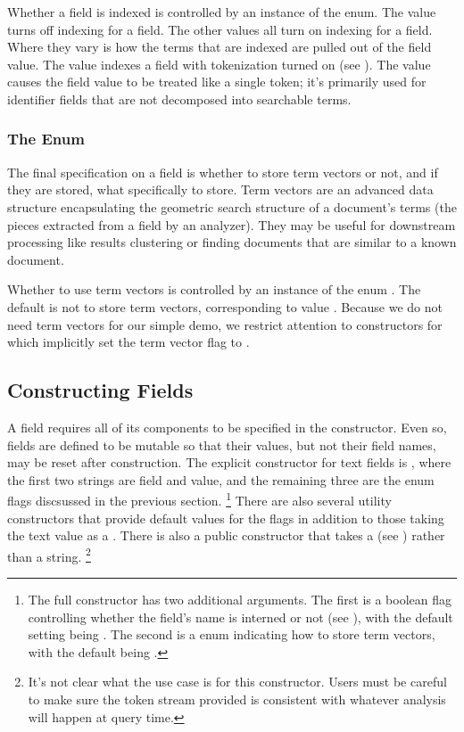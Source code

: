 Whether a field is indexed is controlled by an instance of the
 enum.  The value  turns off indexing
for a field.  The other values all turn on indexing for a field.
Where they vary is how the terms that are indexed are pulled out of
the field value.  The value  indexes a field with
tokenization turned on (see ).  The value
 causes the field value to be treated like a
single token; it's primarily used for identifier fields that are not
decomposed into searchable terms.

\subsubsection{The  Enum}

The final specification on a field is whether to store term vectors or
not, and if they are stored, what specifically to store.  Term vectors
are an advanced data structure encapsulating the geometric search
structure of a document's terms (the pieces extracted from a field by
an analyzer).  They may be useful for downstream processing like
results clustering or finding documents that are similar to a known
document.

Whether to use term vectors is controlled by an instance of the enum
.  The default is not to store term vectors,
corresponding to value .  Because we do not need
term vectors for our simple demo, we restrict attention to
constructors for  which implicitly set the term vector
flag to .


\subsection{Constructing Fields}

A field requires all of its components to be specified in the
constructor.  Even so, fields are defined to be mutable so that their
values, but not their field names, may be reset after construction.
The explicit constructor for text fields is
,
where the first two strings are field and value, and the remaining
three are the enum flags discsussed in the previous section.%
%
\footnote{The full constructor has two additional arguments.  The
  first is a boolean flag controlling whether the field's name is
  interned or not (see ), with the default
  setting being .  The second is a 
  enum indicating how to store term vectors, with the default
  being .}
%
There are also several utility constructors that provide default
values for the flags in addition to those taking the text value as a
.  There is also a public constructor that takes a
 (see ) rather than a
string.%
%
\footnote{It's not clear what the use case is for this constructor.
Users must be careful to make sure the token stream provided is
consistent with whatever analysis will happen at query time.}

